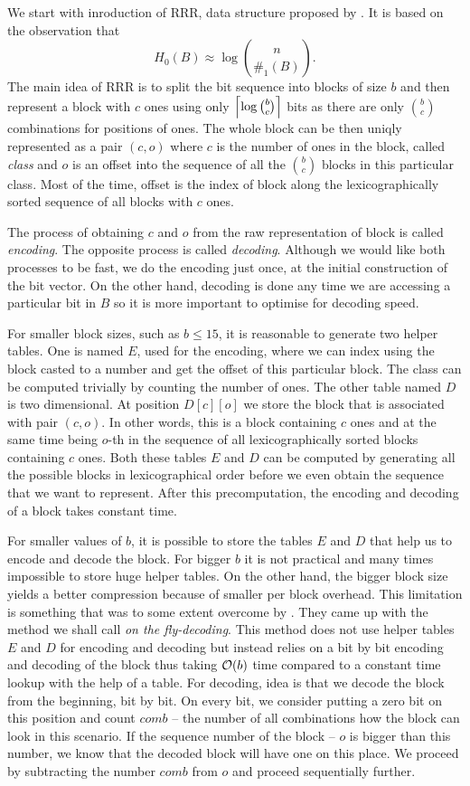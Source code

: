 We start with inroduction of RRR, data structure proposed by \cite{raman2007succinct}. It is based
on the observation that $$H_0(B)\approx \log {n \choose \#_1(B)}.$$ The main idea of RRR is to
split the bit sequence into blocks of size $b$ and then represent a block with $c$ ones using only
$\left\lceil \log {b \choose c} \right\rceil$ bits as there are only ${b \choose c}$ combinations for positions of ones.
The whole block can be then uniqly represented as a pair $(c, o)$ where $c$ is the number of ones in the
block, called \emph{class} and $o$ is an offset into the sequence of all the ${b \choose c}$ blocks
in this particular class. Most of the time, offset is the index of block along the lexicographically
sorted sequence of all blocks with $c$ ones.

The process of obtaining $c$ and $o$ from the raw representation of block is called
\textit{encoding}. The opposite process is called \textit{decoding}. Although we would
like both processes to be fast, we do the encoding just once, at the initial construction
of the bit vector. On the other hand, decoding is done any time we are accessing a particular
bit in $B$ so it is more important to optimise for decoding speed.

For smaller block sizes, such as $b\leq 15$, it is reasonable to
generate two helper tables. One is named $E$, used for the encoding, where we can
index using the block casted to a number and get the offset of this particular block.
The class can be computed trivially by counting the number of ones. The other table
named $D$ is two dimensional. At position $D[c][o]$ we store the block that
is associated with pair $(c, o)$. In other words, this is a block containing $c$ ones
and at the same time being $o$-th in the sequence of all lexicographically sorted
blocks containing $c$ ones. Both these tables $E$ and $D$ can be computed
by generating all the possible blocks in lexicographical order before we even
obtain the sequence that we want to represent. After this precomputation,
the encoding and decoding of a block takes constant time.

For smaller values of $b$, it is possible to store the tables $E$ and $D$ that help us
to encode and decode the block. For bigger $b$ it is not practical and many times
impossible to store huge helper tables. On the other hand, the bigger block size yields a
better compression because of smaller per block overhead. This limitation is something that
was to some extent overcome by \cite{navarro2012fast}. They came up with the method we shall
call \textit{on the fly-decoding}. This method does not use helper tables $E$ and $D$ for
encoding and decoding but instead relies on a bit by bit encoding and decoding of the block
thus taking $\mathcal{O}(b)$ time compared to a constant time lookup with the help of a table.
For decoding, idea is that we decode the block from the beginning, bit by bit. On every bit,
we consider putting a zero bit on this position and count $comb$ -- the number of all
combinations how the block can look in this scenario. If the sequence number of the block --
$o$ is bigger than this number, we know that the decoded block will have one on this place.
We proceed by subtracting the number $comb$ from $o$ and proceed sequentially further.

